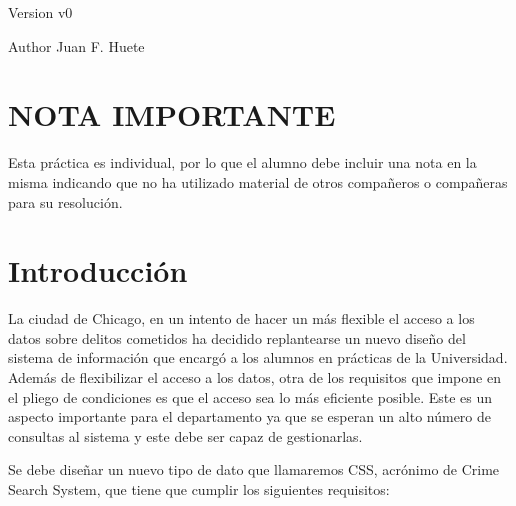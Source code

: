 \begin{DoxyVersion}{Version}
v0 
\end{DoxyVersion}
\begin{DoxyAuthor}{Author}
Juan F. Huete
\end{DoxyAuthor}
\hypertarget{index_NOTA}{}\section{N\+O\+T\+A I\+M\+P\+O\+R\+T\+A\+N\+T\+E}\label{index_NOTA}
Esta práctica es individual, por lo que el alumno debe incluir una nota en la misma indicando que no ha utilizado material de otros compañeros o compañeras para su resolución. \hypertarget{index_intro_sec}{}\section{Introducción}\label{index_intro_sec}
La ciudad de Chicago, en un intento de hacer un más flexible el acceso a los datos sobre delitos cometidos ha decidido replantearse un nuevo diseño del sistema de información que encargó a los alumnos en prácticas de la Universidad. Además de flexibilizar el acceso a los datos, otra de los requisitos que impone en el pliego de condiciones es que el acceso sea lo más eficiente posible. Este es un aspecto importante para el departamento ya que se esperan un alto número de consultas al sistema y este debe ser capaz de gestionarlas.

Se debe diseñar un nuevo tipo de dato que llamaremos C\+S\+S, acrónimo de Crime Search System, que tiene que cumplir los siguientes requisitos\+:

